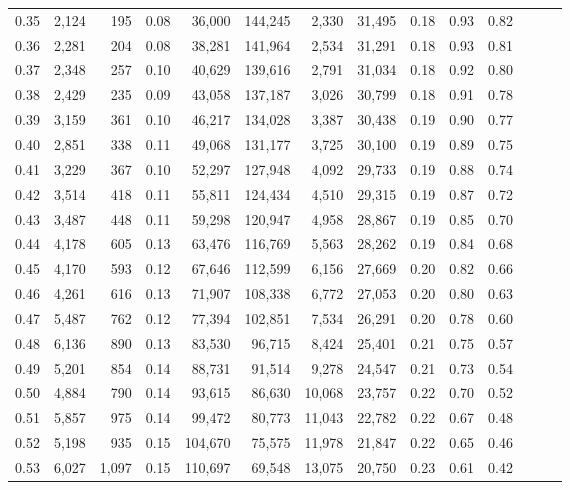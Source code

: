 \begin{tabular}{rrrrrrrrrrrrrr}
0.35 &  2,124 &    195 &  0.08 &   36,000 &  144,245 &   2,330 &  31,495 &  0.18 &  0.93 &      0.82 \\
0.36 &  2,281 &    204 &  0.08 &   38,281 &  141,964 &   2,534 &  31,291 &  0.18 &  0.93 &      0.81 \\
0.37 &  2,348 &    257 &  0.10 &   40,629 &  139,616 &   2,791 &  31,034 &  0.18 &  0.92 &      0.80 \\
0.38 &  2,429 &    235 &  0.09 &   43,058 &  137,187 &   3,026 &  30,799 &  0.18 &  0.91 &      0.78 \\
0.39 &  3,159 &    361 &  0.10 &   46,217 &  134,028 &   3,387 &  30,438 &  0.19 &  0.90 &      0.77 \\
0.40 &  2,851 &    338 &  0.11 &   49,068 &  131,177 &   3,725 &  30,100 &  0.19 &  0.89 &      0.75 \\
0.41 &  3,229 &    367 &  0.10 &   52,297 &  127,948 &   4,092 &  29,733 &  0.19 &  0.88 &      0.74 \\
0.42 &  3,514 &    418 &  0.11 &   55,811 &  124,434 &   4,510 &  29,315 &  0.19 &  0.87 &      0.72 \\
0.43 &  3,487 &    448 &  0.11 &   59,298 &  120,947 &   4,958 &  28,867 &  0.19 &  0.85 &      0.70 \\
0.44 &  4,178 &    605 &  0.13 &   63,476 &  116,769 &   5,563 &  28,262 &  0.19 &  0.84 &      0.68 \\
0.45 &  4,170 &    593 &  0.12 &   67,646 &  112,599 &   6,156 &  27,669 &  0.20 &  0.82 &      0.66 \\
0.46 &  4,261 &    616 &  0.13 &   71,907 &  108,338 &   6,772 &  27,053 &  0.20 &  0.80 &      0.63 \\
0.47 &  5,487 &    762 &  0.12 &   77,394 &  102,851 &   7,534 &  26,291 &  0.20 &  0.78 &      0.60 \\
0.48 &  6,136 &    890 &  0.13 &   83,530 &   96,715 &   8,424 &  25,401 &  0.21 &  0.75 &      0.57 \\
0.49 &  5,201 &    854 &  0.14 &   88,731 &   91,514 &   9,278 &  24,547 &  0.21 &  0.73 &      0.54 \\
0.50 &  4,884 &    790 &  0.14 &   93,615 &   86,630 &  10,068 &  23,757 &  0.22 &  0.70 &      0.52 \\
0.51 &  5,857 &    975 &  0.14 &   99,472 &   80,773 &  11,043 &  22,782 &  0.22 &  0.67 &      0.48 \\
0.52 &  5,198 &    935 &  0.15 &  104,670 &   75,575 &  11,978 &  21,847 &  0.22 &  0.65 &      0.46 \\
0.53 &  6,027 &  1,097 &  0.15 &  110,697 &   69,548 &  13,075 &  20,750 &  0.23 &  0.61 &      0.42 \\

\end{tabular}

